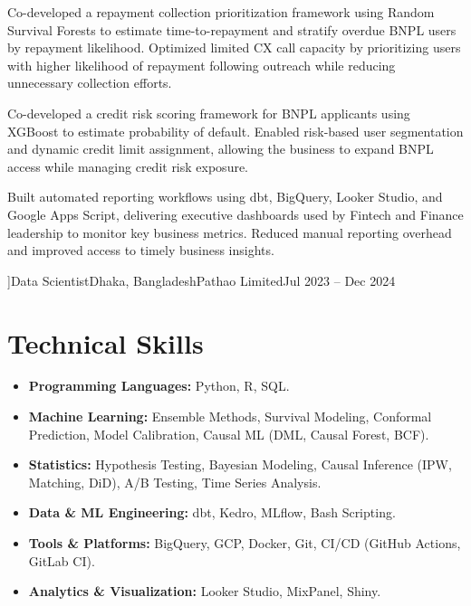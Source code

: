 \documentclass[10pt]{article}
\begin{document}
  \item Co-developed a repayment collection prioritization framework using Random
  Survival Forests to estimate time-to-repayment and stratify overdue BNPL users
  by repayment likelihood. Optimized limited CX call capacity by prioritizing
  users with higher likelihood of repayment following outreach while reducing
  unnecessary collection efforts.

  \item Co-developed a credit risk scoring framework for BNPL applicants using
  XGBoost to estimate probability of default. Enabled risk-based user segmentation
  and dynamic credit limit assignment, allowing the business to expand BNPL access
  while managing credit risk exposure.

  \item Built automated reporting workflows using dbt, BigQuery, Looker Studio,
  and Google Apps Script, delivering executive dashboards used by Fintech
  and Finance leadership to monitor key business metrics. Reduced manual
  reporting overhead and improved access to timely business insights.

]{Data Scientist}{Dhaka, Bangladesh}{Pathao Limited}{Jul 2023 -- Dec 2024}



\section*{Technical Skills}

\begin{itemize}[itemsep=2pt, parsep=0pt, topsep=0pt, leftmargin=*]

  \item \textbf{Programming Languages:} Python, R, SQL.

  \item \textbf{Machine Learning:} Ensemble Methods, Survival Modeling, Conformal
        Prediction, Model Calibration, Causal ML (DML, Causal Forest, BCF).

  \item \textbf{Statistics:} Hypothesis Testing, Bayesian Modeling,
        Causal Inference (IPW, Matching, DiD), A/B Testing, Time Series Analysis.

  \item \textbf{Data \& ML Engineering:} dbt, Kedro, MLflow, Bash Scripting.

  \item \textbf{Tools \& Platforms:} BigQuery, GCP, Docker, Git,
        CI/CD (GitHub Actions, GitLab CI).

  \item \textbf{Analytics \& Visualization:} Looker Studio, MixPanel, Shiny.

\end{itemize}
\end{document}
